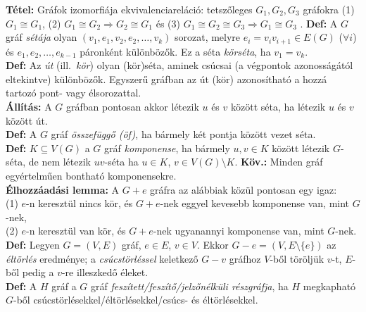\documentclass[a4paper]{article}
\newcommand{\0}{{\bf 0}}
\newcommand{\tetel}{{\bf Tétel:} }
\newcommand{\all}{{\bf Állítás:} }
\newcommand{\kov}{{\bf Köv.:} }
\newcommand{\defi}{{\bf Def:} }
\begin{document}
    
    \tetel Gráfok izomorfiája ekvivalenciareláció: tetszőleges
    $G_1,G_2,G_3$ gráfokra (1) $G_1\cong G_1$, (2) $G_1\cong G_2\Rightarrow
    G_2\cong G_1$ és (3) $G_1\cong G_2\cong G_3\Rightarrow
    G_1\cong G_3$ .
    \fi
    \defi A $G$ gráf \emph{sétája} olyan $(v_1,e_1,v_2,e_2,\ldots,v_k)$
    sorozat, melyre $e_i=v_iv_{i+1}\in E(G)$ ($\forall i$) és
    $e_1,e_2,\ldots,e_{k-1}$ páronként különbözők.
    Ez a séta \emph{körséta}, ha $v_1=v_k$.\\
    \defi Az \emph{út} (ill.\ \emph{kör}) olyan (kör)séta, aminek csúcsai (a
    végpontok azonosságától eltekintve) különbözők. Egyszerű gráfban az út
    (kör) azonosítható a hozzá tartozó pont- vagy élsorozattal.\\
    \all A $G$ gráfban pontosan akkor létezik $u$ és $v$ között séta,
    ha létezik $u$ és $v$ között út.\\
    \iffalse
    {\bf Áll.:} A $\sim$ reláció ekvivalenciareláció: (1) $u\sim u$, (2)
    $u\sim v\Rightarrow v\sim u$, (3) $u\sim v\sim w\Rightarrow u\sim w$
    tetszőleges $u,v,w\in V(G)$-re.
    \fi
    \defi A $G$ gráf \emph{összefüggő (öf)}, ha bármely két pontja között vezet
    séta.\\
    \iffalse
    $u,v\in V(G)$-re $u\sim v$, ha létezik $u$ és $v$ között séta. A $G$ gráf
    \emph{komponense} a $\sim$ ekvivalenciareláció ekvivalenciaosztálya.
    \fi
    \defi $K\subseteq V(G)$ a $G$ gráf \emph{komponense}, ha bármely
    $u,v\in K$ között létezik $G$-séta, de nem létezik $uv$-séta ha $u\in K$,
    $v\in V(G)\setminus K$.
    \hfill
    \kov Minden gráf egyértelműen bontható komponensekre.\\
    {\bf Élhozzáadási lemma:}
    A  $G+e$ gráfra az alábbiak közül pontosan egy igaz:\\
    (1) $e$-n keresztül nincs kör, és $G+e$-nek eggyel kevesebb komponense van, mint
    $G$-nek,\\
    (2) $e$-n keresztül van kör, és $G+e$-nek ugyanannyi komponense
    van, mint $G$-nek. 
    \\
    \defi Legyen $G=(V,E)$ gráf, $e\in E$, $v\in V$. Ekkor
    $G-e=(V,E\setminus\{e\})$ az \emph{éltörlés} eredménye;
    a \emph{csúcstörléssel} keletkező $G-v$ gráfhoz
    $V$-ből töröljük $v$-t, $E$-ből pedig a $v$-re illeszkedő éleket.\\
    \defi A $H$ gráf a $G$ gráf \emph{feszített/feszítő/jelzőnélküli
      részgráfja}, ha $H$ megkapható $G$-ből
    csúcs\-tör\-lé\-sek\-kel/éltörlésekkel/csúcs- és éltörlésekkel.\\
\end{document}

